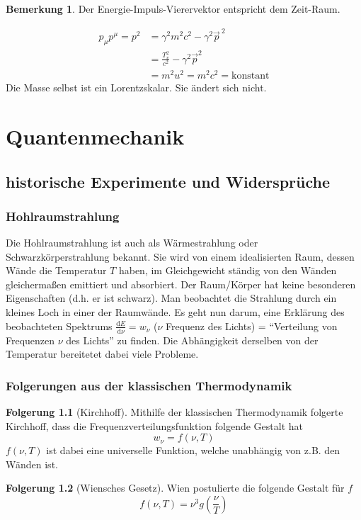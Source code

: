 \documentclass[oneside]{book}
\theoremstyle{definition}
\newtheorem*{bemerkung*}{Bemerkung}
\newtheorem*{folgerung*}{Folgerung}
\renewcommand{\d}{\mathrm d}
\newcommand{\ddd}[2]{\frac{\d #1}{\d #2}}
\newcommand{\const}{\text{konstant}}
\begin{document}
\begin{bemerkung*}
	Der Energie-Impuls-Vierervektor entspricht dem Zeit-Raum.
\end{bemerkung*}

\begin{align*}
	p_\mu p^\mu = p^2 &= \gamma^2 m^2 c^2 - \gamma^2 \vec{p}^{~2}\\
	&= \frac{T_v^2}{c^2} - \gamma^2 \vec{p}^2\\
	&= m^2 u^2 = m^2 c^2 = \const
\end{align*}
Die Masse selbst ist ein Lorentzskalar. Sie ändert sich nicht.

\chapter{Quantenmechanik}
\section{historische Experimente und Widersprüche}
\subsection{Hohlraumstrahlung} Die Hohlraumstrahlung ist auch als Wärmestrahlung oder Schwarzkörperstrahlung bekannt. Sie wird von einem idealisierten Raum, dessen Wände die Temperatur $T$ haben, im Gleichgewicht ständig von den Wänden gleichermaßen emittiert und absorbiert. Der Raum/Körper hat keine besonderen Eigenschaften (d.h. er ist schwarz). Man beobachtet die Strahlung durch ein kleines Loch in einer der Raumwände. Es geht nun darum, eine Erklärung des beobachteten Spektrums $\ddd{E}{\nu} = w_\nu$ ($\nu$ Frequenz des Lichts) = "`Verteilung von Frequenzen $\nu$ des Lichts"' zu finden. Die Abhängigkeit derselben von der Temperatur bereitetet dabei viele Probleme.

\subsection{Folgerungen aus der klassischen Thermodynamik}
\begin{folgerung*}[Kirchhoff]
	Mithilfe der klassischen Thermodynamik folgerte Kirchhoff, dass die Frequenzverteilungsfunktion folgende Gestalt hat
	$$w_\nu = f(\nu, T)$$
	$f(\nu, T)$ ist dabei eine universelle Funktion, welche unabhängig von z.B. den Wänden ist.
\end{folgerung*}

\begin{folgerung*}[Wiensches Gesetz]
Wien postulierte die folgende Gestalt für $f$
$$f(\nu, T) = \nu^3 g(\frac{\nu}{T})$$
\end{folgerung*}
\end{document}
